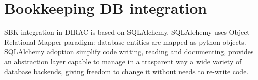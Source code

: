 \documentclass[a4paper]{jpconf}
\begin{document}
\section{Bookkeeping DB integration}
\label{sec:db}
SBK integration in DIRAC is based on SQLAlchemy. SQLAlchemy uses Object Relational Mapper paradigm: database entities are mapped as python objects. SQLAlchemy adoption simplify code writing, reading and documenting, provides an abstraction layer capable to manage in a trasparent way a wide variety of database backends, giving freedom to change it without needs to re-write code.
\end{document}
